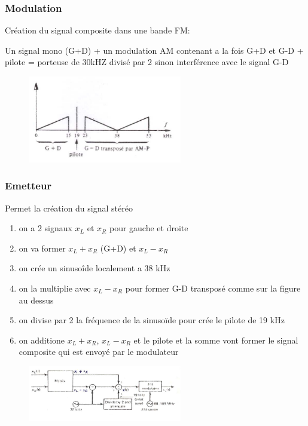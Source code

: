			\subsubsection{Modulation}
				
				Création du signal composite dans une bande FM:
				
				Un signal mono (G+D) + un modulation AM contenant a la fois G+D et G-D + pilote = porteuse de 30kHZ divisé par 2 sinon interférence avec le signal G-D
				
				\begin{figure}[htp]
				\centering
				\includegraphics[width=0.6\textwidth]{img/signalStéréo.png}
				\end{figure}
			
			\subsubsection{Emetteur}
				Permet la création du signal stéréo
				
				\begin{enumerate}
					\item on a 2 signaux $x_L$ et $x_R$ pour gauche et droite
					\item on va former $x_L + x_R$ (G+D) et $x_L - x_R$
					\item on crée un sinusoîde localement a 38 kHz
					\item on la multiplie avec $x_L - x_R$ pour former G-D transposé comme sur la figure au dessus
					\item on divise par 2 la fréquence de la sinusoïde pour crée le pilote de 19 kHz
					\item on additione $x_L + x_R$, $x_L - x_R$ et le pilote et la somme vont former le signal composite qui est envoyé par le modulateur
				\end{enumerate}
				
				\begin{figure}[htp]
				\centering
				\includegraphics[width=0.6\textwidth]{img/emeteurStereo.png}
				\end{figure}
				
